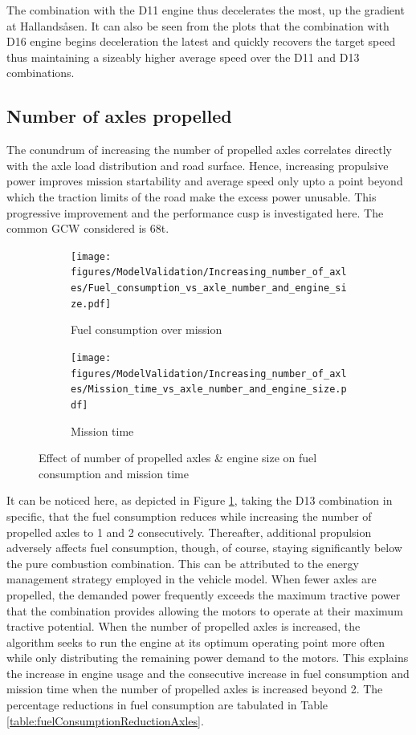 \documentclass[ExampleMasters.tex]{subfiles}
\begin{document}
The combination with the D11 engine thus decelerates the most, up the gradient at Hallands\aa sen. It can also be seen from the plots that the combination with D16 engine begins deceleration the latest and quickly recovers the target speed thus maintaining a sizeably higher average speed over the D11 and D13 combinations.

\subsection{Number of axles propelled}

The conundrum of increasing the number of propelled axles correlates directly with the axle load distribution and road surface. Hence, increasing propulsive power improves mission startability and average speed only upto a point beyond which the traction limits of the road make the excess power unusable. This progressive improvement and the performance cusp is investigated here. The common GCW considered is 68t.\\

\begin{figure}[h!]
\begin{subfigure}{.5\textwidth}
	\centering
	\texttt{[image: figures/ModelValidation/Increasing\_number\_of\_axles/Fuel\_consumption\_vs\_axle\_number\_and\_engine\_size.pdf]}
	\caption{Fuel consumption over mission}
\end{subfigure}
\begin{subfigure}{.5\textwidth}
	\centering
	\texttt{[image: figures/ModelValidation/Increasing\_number\_of\_axles/Mission\_time\_vs\_axle\_number\_and\_engine\_size.pdf]}
	\caption{Mission time}
\end{subfigure}
\caption{Effect of number of propelled axles \& engine size on fuel consumption and mission time}
\label{timeFuelNumberOfAxlesEngine}
\end{figure}

It can be noticed here, as depicted in Figure \ref{timeFuelNumberOfAxlesEngine}, taking the D13 combination in specific, that the fuel consumption reduces while increasing the number of propelled axles to 1 and 2 consecutively. Thereafter, additional propulsion adversely affects fuel consumption, though, of course, staying significantly below the pure combustion combination. This can be attributed to the energy management strategy employed in the vehicle model. When fewer axles are propelled, the demanded power frequently exceeds the maximum tractive power that the combination provides allowing the motors to operate at their maximum tractive potential. When the number of propelled axles is increased, the algorithm seeks to run the engine at its optimum operating point more often while only distributing the remaining power demand to the motors. This explains the increase in engine usage and the consecutive increase in fuel consumption and mission time when the number of propelled axles is increased beyond 2. The percentage reductions in fuel consumption are tabulated in Table \ref{table:fuelConsumptionReductionAxles}.\\
\end{document}
